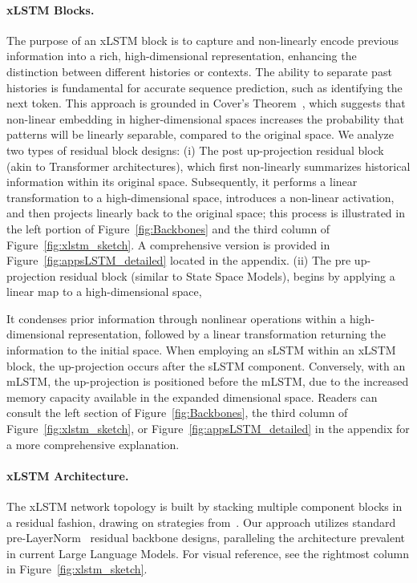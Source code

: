 \paragraph{xLSTM Blocks.}
\label{sec:xLSTMblock}
The purpose of an xLSTM block is to capture and non-linearly encode previous information into a rich, high-dimensional representation, enhancing the distinction between different histories or contexts. The ability to separate past histories is fundamental for accurate sequence prediction, such as identifying the next token. This approach is grounded in Cover’s Theorem~\citep{Cover:65}, which suggests that non-linear embedding in higher-dimensional spaces increases the probability that patterns will be linearly separable, compared to the original space. We analyze two types of residual block designs: (i) The post up-projection residual block (akin to Transformer architectures), which first non-linearly summarizes historical information within its original space. Subsequently, it performs a linear transformation to a high-dimensional space, introduces a non-linear activation, and then projects linearly back to the original space; this process is illustrated in the left portion of Figure~\ref{fig:Backbones}
and the third column of Figure~\ref{fig:xlstm_sketch}. 
A comprehensive version is provided in Figure~\ref{fig:appsLSTM_detailed}
located in the appendix. (ii) The pre up-projection residual block (similar to State Space Models), begins by applying a linear map to a high-dimensional space,

It condenses prior information through nonlinear operations within a high-dimensional representation, followed by a linear transformation returning the information to the initial space. When employing an sLSTM within an xLSTM block, the up-projection occurs after the sLSTM component. Conversely, with an mLSTM, the up-projection is positioned before the mLSTM, due to the increased memory capacity available in the expanded dimensional space. Readers can consult the left section of Figure~\ref{fig:Backbones}, the third column of Figure~\ref{fig:xlstm_sketch}, or Figure~\ref{fig:appsLSTM_detailed} in the appendix for a more comprehensive explanation.

\paragraph{xLSTM Architecture. }
\label{sec:xLSTMarchitecure}
The xLSTM network topology is built by stacking multiple component blocks in a residual fashion, drawing on strategies from~\citep{Srivastava:15,He:16}. Our approach utilizes standard pre-LayerNorm~\citep{Ba:16b} residual backbone designs, paralleling the architecture prevalent in current Large Language Models. For visual reference, see the rightmost column in Figure~\ref{fig:xlstm_sketch}.

